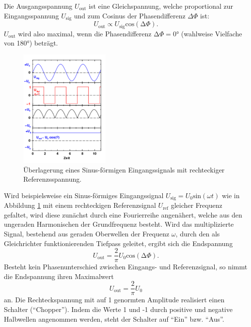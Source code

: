 Die Ausgangsspannung $U_\mathup{out}$ ist eine Gleichspannung, welche proportional zur Eingangsspannung $U_\mathup{sig}$ und zum Cosinus der Phasendifferenz $\Delta\Phi$ ist:
\begin{equation}
 	U_\mathup{out}\propto{U_\text{sig}}\text{cos}(\mathup{\Delta}\Phi). 
 	\label{cosinus_ausgangsspannung}
 \end{equation} 
$U_\mathup{out}$ wird also maximal, wenn die Phasendifferenz $\mathup{\Delta}\Phi=0°$ (wahlweise Vielfache von 180°) beträgt. \cite{regensburg}

\begin{figure}
	\centering
		\includegraphics[width=0.4\textwidth]{Bilder/Beispiel.pdf}
		\caption{Überlagerung eines Sinus-förmigen Eingangssignals mit rechteckiger Referenzsspannung. \cite{V303}}
		\label{fig:bsp}
	\end{figure}
Wird beispielsweise ein Sinus-förmiges Eingangssignal $U_\mathup{sig}=U_0\text{sin}(\omega t)$ wie in Abbildung \ref{fig:bsp} mit einem rechteckigen Referenzsignal $U_\mathup{ref}$ gleicher Frequenz gefaltet, wird diese zunächst durch eine Fourierreihe angenähert, welche aus den ungeraden Harmonischen der Grundfrequenz besteht. 
Wird das multiplizierte Signal,  bestehend aus geraden Oberwellen der Frequenz $\omega$, durch den als Gleichrichter funktionierenden Tiefpass geleitet, ergibt sich die Endspannung
\begin{equation}
	U_\mathup{out}=\frac{2}{\pi}U_0\text{cos}(\mathup{\Delta}\Phi).
\end{equation}
Besteht kein Phasenunterschied zwischen Eingangs- und Referenzsignal, so nimmt die Endspannung ihren Maximalwert 
\begin{equation}
	U_\mathup{out}=\frac{2}{\pi}U_0
\end{equation}
an.
Die Rechteckspannung mit auf 1 genormten Amplitude realisiert einen Schalter (\enquote{Chopper}). 
Indem die Werte 1 und -1 durch positive und negative Halbwellen angenommen werden, steht der Schalter auf \enquote{Ein} bzw. \enquote{Aus}.



